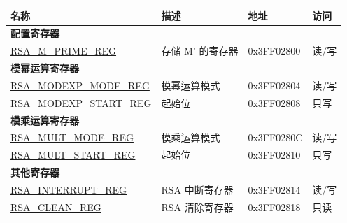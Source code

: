\label{sec:rsa-reg-summ}

\begin{longtable}{ | p{5cm} | p{7.5cm} | p{2cm} | p{1cm} | }
\hline\rowcolor{lightgray}
名称 & 描述 &  地址 & 访问 \\ \hline
\multicolumn{4}{|l|}{\textbf{配置寄存器}} \\ \hline
\hyperref[regdesc:RSAMPRIMEREG]{RSA\_M\_PRIME\_REG} & 存储 M' 的寄存器 & 0x3FF02800 & 读/写 \\ \hline
\multicolumn{4}{|l|}{\textbf{模幂运算寄存器}} \\ \hline
\hyperref[regdesc:RSAMODEXPMODEREG]{RSA\_MODEXP\_MODE\_REG} & 模幂运算模式 & 0x3FF02804 & 读/写 \\ \hline
\hyperref[regdesc:RSAMODEXPSTARTREG]{RSA\_MODEXP\_START\_REG} & 起始位 & 0x3FF02808 & 只写 \\ \hline
\multicolumn{4}{|l|}{\textbf{模乘运算寄存器}} \\ \hline
\hyperref[regdesc:RSAMULTMODEREG]{RSA\_MULT\_MODE\_REG} & 模乘运算模式 & 0x3FF0280C & 读/写 \\ \hline
\hyperref[regdesc:RSAMULTSTARTREG]{RSA\_MULT\_START\_REG} & 起始位 & 0x3FF02810 & 只写 \\ \hline
\multicolumn{4}{|l|}{\textbf{其他寄存器}} \\ \hline
\hyperref[regdesc:RSAINTERRUPTREG]{RSA\_INTERRUPT\_REG} & RSA 中断寄存器 & 0x3FF02814 & 读/写 \\ \hline
\hyperref[regdesc:RSACLEANREG]{RSA\_CLEAN\_REG} & RSA 清除寄存器 & 0x3FF02818 & 只读 \\ \hline
\end{longtable}
